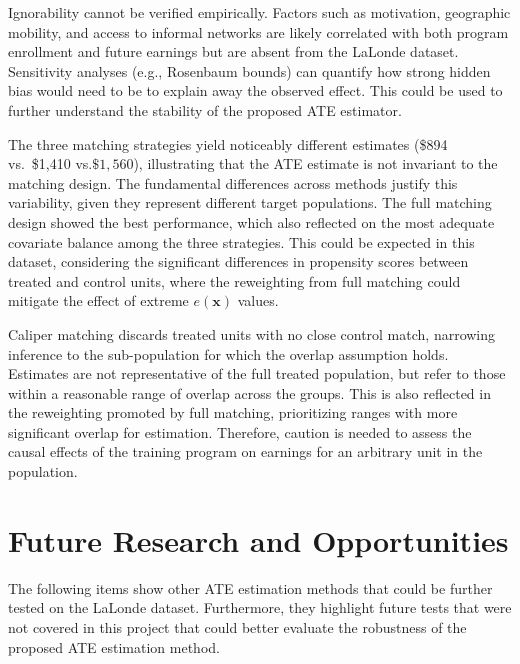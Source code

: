 \documentclass[12pt, a4paper]{article}
\begin{document}
\begin{description}[leftmargin=2em, style=nextline]
  \item[Unmeasured confounders]
    Ignorability cannot be verified empirically. Factors such as motivation, geographic mobility, and access to informal networks are likely correlated with both program enrollment and future earnings but are absent from the LaLonde dataset. Sensitivity analyses (e.g., Rosenbaum bounds) can quantify how strong hidden bias would need to be to explain away the observed effect. This could be used to further understand the stability of the proposed ATE estimator.
  \item[Sensitivity to matching method]
    The three matching strategies yield noticeably different estimates (\$894 vs.\ \$1{,}410 vs.$\$1{,}560$), illustrating that the ATE estimate is not invariant to the matching design. The fundamental differences across methods justify this variability, given they represent different target populations. The full matching design showed the best performance, which also reflected on the most adequate covariate balance among the three strategies. This could be expected in this dataset, considering the significant differences in propensity scores between treated and control units, where the reweighting from full matching could mitigate the effect of extreme $e(\mathbf{x})$ values.
  \item[Generalizability]
    Caliper matching discards treated units with no close control match, narrowing inference to the sub-population for which the overlap assumption holds. Estimates are not representative of the full treated population, but refer to those within a reasonable range of overlap across the groups. This is also reflected in the reweighting promoted by full matching, prioritizing ranges with more significant overlap for estimation. Therefore, caution is needed to assess the causal effects of the training program on earnings for an arbitrary unit in the population.
\end{description}

\section{Future Research and Opportunities}

The following items show other ATE estimation methods that could be further tested on the LaLonde dataset. Furthermore, they highlight future tests that were not covered in this project that could better evaluate the robustness of the proposed ATE estimation method.
\end{document}
